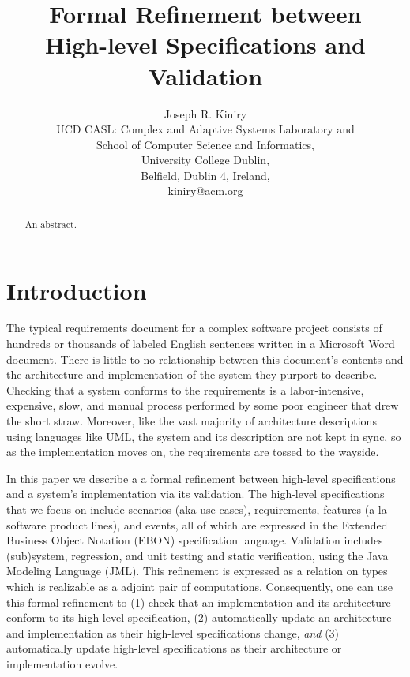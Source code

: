 \documentclass{article}
\begin{document}
\title{Formal Refinement between\\
High-level Specifications and Validation}

\author{Joseph R. Kiniry\\
UCD CASL: Complex and Adaptive Systems Laboratory and\\
School of Computer Science and Informatics,\\
University College Dublin,\\
Belfield, Dublin 4, Ireland,\\
kiniry@acm.org\\
}

\maketitle

\begin{abstract}
  
  An abstract.

\end{abstract}

\section{Introduction}

The typical requirements document for a complex software project
consists of hundreds or thousands of labeled English sentences written
in a Microsoft Word document.  There is little-to-no relationship
between this document's contents and the architecture and
implementation of the system they purport to describe.  Checking that
a system conforms to the requirements is a labor-intensive, expensive,
slow, and manual process performed by some poor engineer that drew the
short straw.  Moreover, like the vast majority of architecture
descriptions using languages like UML, the system and its description
are not kept in sync, so as the implementation moves on, the
requirements are tossed to the wayside.

In this paper we describe a a formal refinement between high-level
specifications and a system's implementation via its validation.  The
high-level specifications that we focus on include scenarios (aka
use-cases), requirements, features (a la software product lines), and
events, all of which are expressed in the Extended Business Object
Notation (EBON) specification language.  Validation includes
(sub)system, regression, and unit testing and static verification,
using the Java Modeling Language (JML).  This refinement is expressed
as a relation on types which is realizable as a adjoint pair of
computations.  Consequently, one can use this formal refinement to (1)
check that an implementation and its architecture conform to its
high-level specification, (2) automatically update an architecture and
implementation as their high-level specifications change, \emph{and}
(3) automatically update high-level specifications as their
architecture or implementation evolve.
\end{document}
